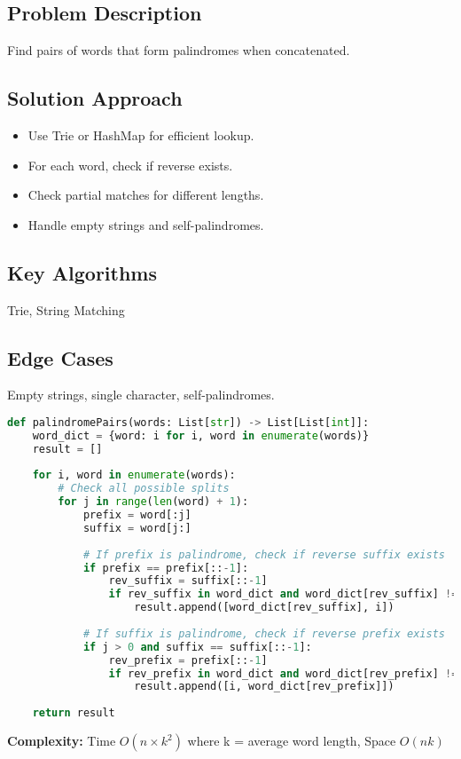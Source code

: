 \documentclass[10pt, a4paper]{article}
\begin{document}
\subsection*{Problem Description}
Find pairs of words that form palindromes when concatenated.

\subsection*{Solution Approach}
\begin{itemize}
    \item Use Trie or HashMap for efficient lookup.
    \item For each word, check if reverse exists.
    \item Check partial matches for different lengths.
    \item Handle empty strings and self-palindromes.
\end{itemize}

\subsection*{Key Algorithms}
Trie, String Matching

\subsection*{Edge Cases}
Empty strings, single character, self-palindromes.

\begin{lstlisting}[language=Python]
def palindromePairs(words: List[str]) -> List[List[int]]:
    word_dict = {word: i for i, word in enumerate(words)}
    result = []
    
    for i, word in enumerate(words):
        # Check all possible splits
        for j in range(len(word) + 1):
            prefix = word[:j]
            suffix = word[j:]
            
            # If prefix is palindrome, check if reverse suffix exists
            if prefix == prefix[::-1]:
                rev_suffix = suffix[::-1]
                if rev_suffix in word_dict and word_dict[rev_suffix] != i:
                    result.append([word_dict[rev_suffix], i])
            
            # If suffix is palindrome, check if reverse prefix exists
            if j > 0 and suffix == suffix[::-1]:
                rev_prefix = prefix[::-1]
                if rev_prefix in word_dict and word_dict[rev_prefix] != i:
                    result.append([i, word_dict[rev_prefix]])
    
    return result
\end{lstlisting}
\textbf{Complexity:} Time $O(n \times k^2)$ where k = average word length, Space $O(nk)$
\end{document}
